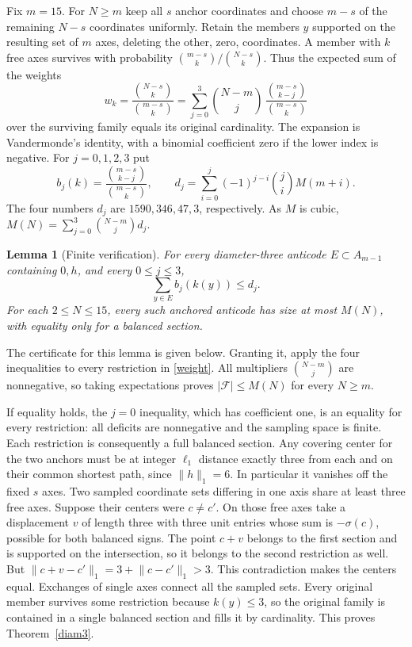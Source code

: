 \documentclass[10pt]{article}
\newtheorem{lemma}[theorem]{Lemma}
\newcommand{\F}{\mathcal F}
\newcommand{\s}{\sigma}
\newcommand{\norm}[1]{\lVert #1\rVert_1}
\begin{document}
Fix $m=15$. For $N\ge m$ keep all $s$ anchor coordinates and choose $m-s$ of the remaining $N-s$ coordinates uniformly. Retain the members $y$ supported on the resulting set of $m$ axes, deleting the other, zero, coordinates. A member with $k$ free axes survives with probability $\binom{m-s}k/\binom{N-s}k$. Thus the expected sum of the weights
\[
 w_k=\frac{\binom{N-s}k}{\binom{m-s}k}
     =\sum_{j=0}^3\binom{N-m}j\,
       \frac{\binom{m-s}{k-j}}{\binom{m-s}k}
 \tag{A}\label{weight}
\]
over the surviving family equals its original cardinality. The expansion is Vandermonde's identity, with a binomial coefficient zero if the lower index is negative. For $j=0,1,2,3$ put
\[
 b_j(k)=\frac{\binom{m-s}{k-j}}{\binom{m-s}k},\qquad
 d_j=\sum_{i=0}^{j}(-1)^{j-i}\binom ji M(m+i).
\]
The four numbers $d_j$ are $1590,346,47,3$, respectively. As $M$ is cubic,
$M(N)=\sum_{j=0}^3\binom{N-m}{j}d_j$.

\begin{lemma}[Finite verification]\label{finite}
For every diameter-three anticode $E\subset A_{m-1}$ containing $0,h$, and every $0\le j\le3$,
\[
                        \sum_{y\in E} b_j(k(y))\le d_j.
\]
For each $2\le N\le15$, every such anchored anticode has size at most $M(N)$, with equality only for a balanced section.
\end{lemma}

The certificate for this lemma is given below. Granting it, apply the four inequalities to every restriction in \eqref{weight}. All multipliers $\binom{N-m}{j}$ are nonnegative, so taking expectations proves $|\F|\le M(N)$ for every $N\ge m$.

If equality holds, the $j=0$ inequality, which has coefficient one, is an equality for every restriction: all deficits are nonnegative and the sampling space is finite. Each restriction is consequently a full balanced section. Any covering center for the two anchors must be at integer $\ell_1$ distance exactly three from each and on their common shortest path, since $\norm h=6$. In particular it vanishes off the fixed $s$ axes. Two sampled coordinate sets differing in one axis share at least three free axes. Suppose their centers were $c\ne c'$. On those free axes take a displacement $v$ of length three with three unit entries whose sum is $-\s(c)$, possible for both balanced signs. The point $c+v$ belongs to the first section and is supported on the intersection, so it belongs to the second restriction as well. But $\norm{c+v-c'}=3+\norm{c-c'}>3$. This contradiction makes the centers equal. Exchanges of single axes connect all the sampled sets. Every original member survives some restriction because $k(y)\le3$, so the original family is contained in a single balanced section and fills it by cardinality. This proves Theorem~\ref{diam3}.
\end{document}
